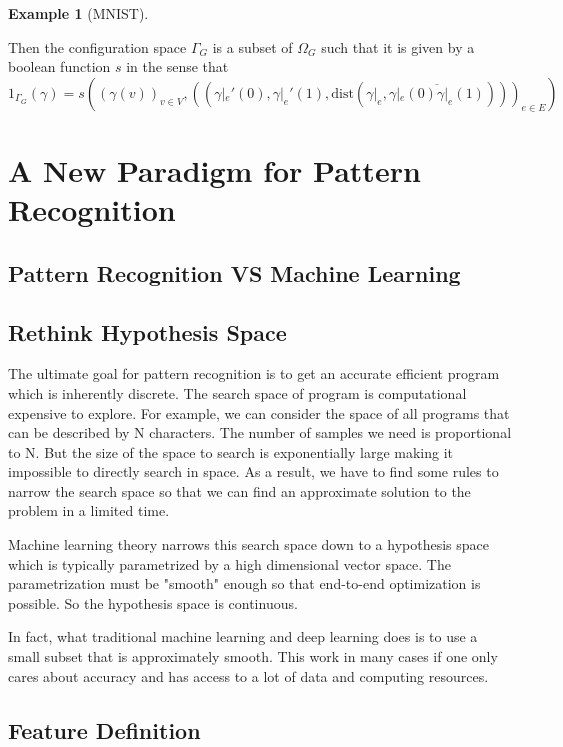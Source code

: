 \documentclass[11pt]{article} 	%
\theoremstyle{definition}
\newtheorem*{example}{Example}
\begin{document}
\begin{example}[MNIST]
\begin{itemize}
Then the configuration space $\Gamma_G$ is a subset of $\Omega_G$ such that it is given by a boolean function $s$ in the sense that
\begin{equation}
	1_{\Gamma_G}(\gamma)=s((\gamma(v))_{v\in V},((\gamma|_e'(0), \gamma|_e'(1), \text{dist}(\gamma|_e,\overline{\gamma|_e(0)\gamma|_e(1)})))_{e\in E})
\end{equation}
\end{itemize}
\end{example}

\section{A New Paradigm for Pattern Recognition }
\subsection{Pattern Recognition VS Machine Learning}

\subsection{Rethink Hypothesis Space}

The ultimate goal for pattern recognition is to get an accurate efficient program which is inherently discrete.  The search space of program is computational expensive to explore.  For example, we can consider the space of all programs that can be described by N characters. The number of samples we need is proportional to N. But the size of the space to search is exponentially large making it impossible to directly search in space.  As a result, we have to find some rules to narrow the search space so that we can find an approximate solution to the problem in a limited time. 

Machine learning theory narrows this search space down to a hypothesis space which is typically parametrized by a high dimensional vector space.  The parametrization must be "smooth" enough so that end-to-end optimization is possible.  So the hypothesis space is continuous.

In fact, what traditional machine learning and deep learning does is to use a small subset that is approximately smooth.  This work in many cases if one only cares about accuracy and has access to a lot of data and computing resources.  




\subsection{Feature Definition}
\end{document}
